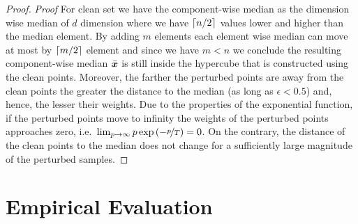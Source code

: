 \documentclass[sigconf,authordraft]{acmart}
\begin{document}
\begin{proof}\textit{Proof}\label{proof:actual_soft_median}
  For clean set we have the component-wise median as the dimension wise median of $d$ dimension where we have $\lceil n/2 \rceil$ values lower and higher than the median element. By adding $m$ elements each element wise median can move at most by $\lceil m/2 \rceil$ element and since we have $m<n$ we conclude the resulting component-wise median $\bar{{\bm{x}}}$ is still inside the hypercube that is constructed using the clean points. Moreover, the farther the perturbed points are away from the clean points the greater the distance to the median (as long as \(\epsilon < 0.5\)) and, hence, the lesser their weights. Due to the properties of the exponential function, if the perturbed points move to infinity the weights of the perturbed points approaches zero, i.e.~\(\lim_{p\to\infty} p \exp{(-\nicefrac{p}{T})} = 0\). On the contrary, the distance of the clean points to the median does not change for a sufficiently large magnitude of the perturbed samples.
\end{proof}

\section{Empirical Evaluation}\label{sec:empirical}
\end{document}
